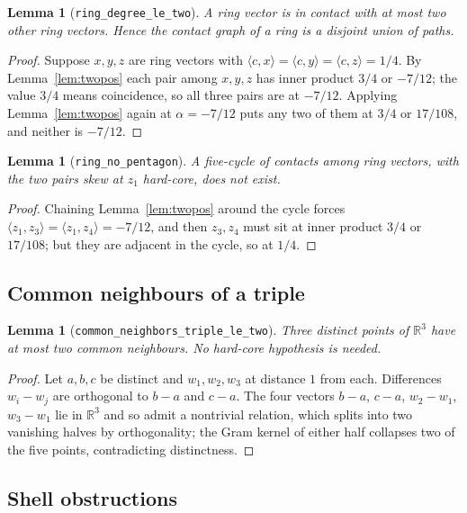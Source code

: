 \documentclass[11pt,a4paper]{article}
\theoremstyle{plain}
\newtheorem{lemma}[theorem]{Lemma}
\theoremstyle{definition}
\newcommand{\R}{\mathbb{R}}
\newcommand{\inner}[2]{\langle #1, #2 \rangle}
\begin{document}
\begin{lemma}[\texttt{ring\_degree\_le\_two}]
\label{lem:ringdeg}
A ring vector is in contact with at most two other ring vectors. Hence the contact
graph of a ring is a disjoint union of paths.
\end{lemma}

\begin{proof}
Suppose $x,y,z$ are ring vectors with $\inner{c}{x} = \inner{c}{y} = \inner{c}{z} =
1/4$. By Lemma~\ref{lem:twopos} each pair among $x,y,z$ has inner product $3/4$ or
$-7/12$; the value $3/4$ means coincidence, so all three pairs are at $-7/12$. Applying
Lemma~\ref{lem:twopos} again at $\alpha = -7/12$ puts any two of them at $3/4$ or
$17/108$, and neither is $-7/12$.
\end{proof}

\begin{lemma}[\texttt{ring\_no\_pentagon}]
\label{lem:nopent}
A five-cycle of contacts among ring vectors, with the two pairs skew at $z_1$
hard-core, does not exist.
\end{lemma}

\begin{proof}
Chaining Lemma~\ref{lem:twopos} around the cycle forces
$\inner{z_1}{z_3} = \inner{z_1}{z_4} = -7/12$, and then $z_3, z_4$ must sit at inner
product $3/4$ or $17/108$; but they are adjacent in the cycle, so at $1/4$.
\end{proof}

\subsection{Common neighbours of a triple}

\begin{lemma}[\texttt{common\_neighbors\_triple\_le\_two}]
\label{lem:triple}
Three distinct points of $\R^3$ have at most two common neighbours. No hard-core
hypothesis is needed.
\end{lemma}

\begin{proof}
Let $a,b,c$ be distinct and $w_1,w_2,w_3$ at distance $1$ from each. Differences
$w_i - w_j$ are orthogonal to $b-a$ and $c-a$. The four vectors
$b-a$, $c-a$, $w_2-w_1$, $w_3-w_1$ lie in $\R^3$ and so admit a nontrivial relation,
which splits into two vanishing halves by orthogonality; the Gram kernel of either half
collapses two of the five points, contradicting distinctness.
\end{proof}

\subsection{Shell obstructions}
\end{document}
